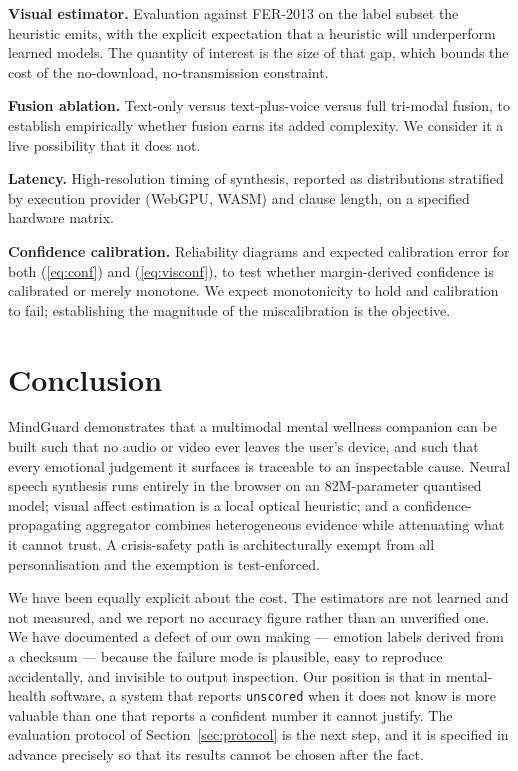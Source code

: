 \documentclass[runningheads]{llncs}
\begin{document}
\textbf{Visual estimator.} Evaluation against FER-2013 \cite{fer2013} on the
label subset the heuristic emits, with the explicit expectation that a
heuristic will underperform learned models. The quantity of interest is the
size of that gap, which bounds the cost of the no-download, no-transmission
constraint.

\textbf{Fusion ablation.} Text-only versus text-plus-voice versus full
tri-modal fusion, to establish empirically whether fusion earns its added
complexity. We consider it a live possibility that it does not.

\textbf{Latency.} High-resolution timing of synthesis, reported as
distributions stratified by execution provider (WebGPU, WASM) and clause
length, on a specified hardware matrix.

\textbf{Confidence calibration.} Reliability diagrams and expected calibration
error for both (\ref{eq:conf}) and (\ref{eq:visconf}), to test whether
margin-derived confidence is calibrated or merely monotone. We expect
monotonicity to hold and calibration to fail; establishing the magnitude of
the miscalibration is the objective.

\section{Conclusion}

MindGuard demonstrates that a multimodal mental wellness companion can be
built such that no audio or video ever leaves the user's device, and such that
every emotional judgement it surfaces is traceable to an inspectable cause.
Neural speech synthesis runs entirely in the browser on an 82M-parameter
quantised model; visual affect estimation is a local optical heuristic; and a
confidence-propagating aggregator combines heterogeneous evidence while
attenuating what it cannot trust. A crisis-safety path is architecturally
exempt from all personalisation and the exemption is test-enforced.

We have been equally explicit about the cost. The estimators are not learned
and not measured, and we report no accuracy figure rather than an unverified
one. We have documented a defect of our own making --- emotion labels derived
from a checksum --- because the failure mode is plausible, easy to reproduce
accidentally, and invisible to output inspection. Our position is that in
mental-health software, a system that reports \texttt{unscored} when it does
not know is more valuable than one that reports a confident number it cannot
justify. The evaluation protocol of Section~\ref{sec:protocol} is the next
step, and it is specified in advance precisely so that its results cannot be
chosen after the fact.
\end{document}
